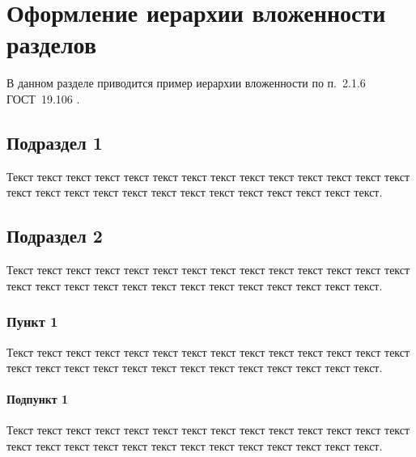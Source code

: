 \newpage
\section{Оформление иерархии вложенности разделов}

В данном разделе приводится пример иерархии вложенности по п.~2.1.6 ГОСТ~19.106 \cite{gost19106}.

%
%

\subsection{Подраздел 1}
Текст текст текст текст текст текст текст текст текст текст текст текст текст текст текст текст текст текст текст текст текст текст текст текст текст текст текст.

\subsection{Подраздел 2}
Текст текст текст текст текст текст текст текст текст текст текст текст текст текст текст текст текст текст текст текст текст текст текст текст текст текст текст.

\subsubsection{Пункт 1} 
Текст текст текст текст текст текст текст текст текст текст текст текст текст текст текст текст текст текст текст текст текст текст текст текст текст текст текст.
%

\paragraph{Подпункт 1} 
Текст текст текст текст текст текст текст текст текст текст текст текст текст текст текст текст текст текст текст текст текст текст текст текст текст текст текст.
%
